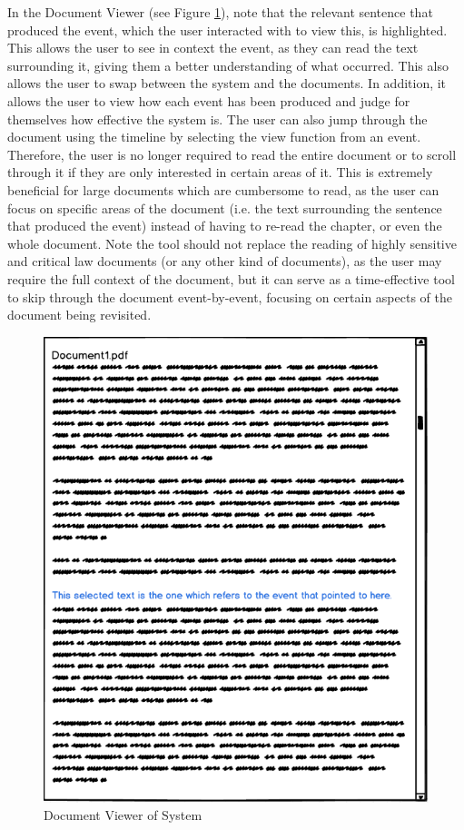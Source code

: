 \par In the Document Viewer (see Figure \ref{fig:viewDoc}), note that the relevant sentence that produced the event, which the user interacted with to view this, is highlighted. This allows the user to see in context the event, as they can read the text surrounding it, giving them a better understanding of what occurred. This also allows the user to swap between the system and the documents. In addition, it allows the user to view how each event has been produced and judge for themselves how effective the system is. The user can also jump through the document using the timeline by selecting the view function from an event. Therefore, the user is no longer required to read the entire document or to scroll through it if they are only interested in certain areas of it. This is extremely beneficial for large documents which are cumbersome to read, as the user can focus on specific areas of the document (i.e. the text surrounding the sentence that produced the event) instead of having to re-read the chapter, or even the whole document. Note the tool should not replace the reading of highly sensitive and critical law documents (or any other kind of documents), as the user may require the full context of the document, but it can serve as a time-effective tool to skip through the document event-by-event, focusing on certain aspects of the document being revisited.

\begin{figure}[H]
\caption{Document Viewer of System}
\label{fig:viewDoc}
\includegraphics[scale=0.75]{viewDoc.png}
\centering
\end{figure}









